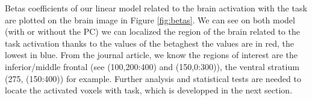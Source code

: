 \noindent
\par Betas coefficients of our linear model related to the brain activation with the task 
are plotted on the brain image in Figure \ref{fig:betas}. We can see on both model 
(with or without the PC) we can localized the region of the brain related to the task 
activation thanks to the values of the betaghest the values are in red, the lowest in blue. 
From the journal article, we know the regions of interest are the inferior/middle frontal 
(see (100,200:400) and (150,0:300)), the ventral stratium (275, (150:400)) for example. Further analysis and statistical tests are needed to locate the activated voxels with task, which is developped in the next section.


